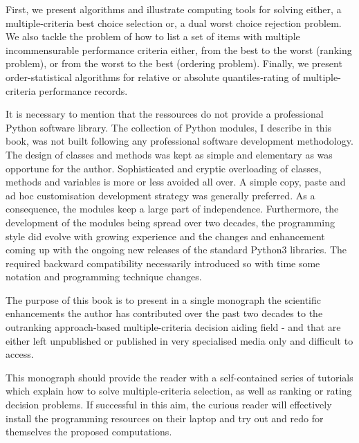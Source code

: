 First, we present algorithms and illustrate computing tools for solving either, a multiple-criteria best choice selection or, a dual worst choice rejection problem. We also tackle the problem of how to list a set of items with multiple incommensurable performance criteria either, from the best to the worst (ranking problem), or from the worst to the best (ordering problem). Finally, we present order-statistical algorithms for relative or absolute quantiles-rating of multiple-criteria performance records.

It is necessary to mention that the \Digraph ressources do not provide a professional Python software library. The collection of Python modules, I describe in this book, was not built following any professional software development methodology. The design of classes and methods was kept as simple and elementary as was opportune for the author. Sophisticated and cryptic overloading of classes, methods and variables is more or less avoided all over. A simple copy, paste and ad hoc customisation development strategy was generally preferred. As a consequence, the \Digraph modules keep a large part of independence.  Furthermore, the development of the \Digraph modules being spread over two decades, the programming style did evolve with growing experience and the changes and enhancement coming up with the ongoing new releases of the standard Python3 libraries. The required backward compatibility necessarily introduced so with time some notation and programming technique changes.


The purpose of this book is to present in a single monograph the scientific enhancements the author has contributed over the past two decades to the outranking approach-based multiple-criteria decision aiding field - and that are either left unpublished or published in very specialised media only and difficult to access.  


This monograph should provide the reader with a self-contained series of tutorials which explain how to solve multiple-criteria selection, as well as ranking or rating decision problems. If successful in this aim, the curious reader will effectively install the \Digraph programming resources on their laptop and try out and redo for themselves the proposed computations.

